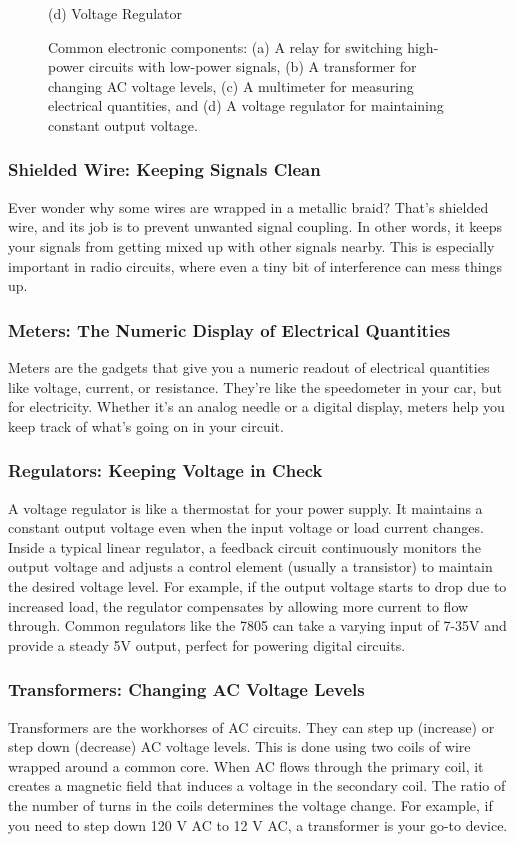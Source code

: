\begin{figure}[h]
\begin{minipage}{0.24\textwidth}
        \caption*{(d) Voltage Regulator}
    \end{minipage}
    \caption{Common electronic components: (a) A relay for switching high-power circuits with low-power signals, (b) A transformer for changing AC voltage levels, (c) A multimeter for measuring electrical quantities, and (d) A voltage regulator for maintaining constant output voltage.}
    \label{fig:electronic-components}
\end{figure}


\subsubsection*{Shielded Wire: Keeping Signals Clean}
Ever wonder why some wires are wrapped in a metallic braid? That's shielded wire, and its job is to prevent unwanted signal coupling. In other words, it keeps your signals from getting mixed up with other signals nearby. This is especially important in radio circuits, where even a tiny bit of interference can mess things up. 

\subsubsection*{Meters: The Numeric Display of Electrical Quantities}
Meters are the gadgets that give you a numeric readout of electrical quantities like voltage, current, or resistance. They’re like the speedometer in your car, but for electricity. Whether it's an analog needle or a digital display, meters help you keep track of what's going on in your circuit.

\subsubsection*{Regulators: Keeping Voltage in Check}
A voltage regulator is like a thermostat for your power supply. It maintains a constant output voltage even when the input voltage or load current changes. Inside a typical linear regulator, a feedback circuit continuously monitors the output voltage and adjusts a control element (usually a transistor) to maintain the desired voltage level. For example, if the output voltage starts to drop due to increased load, the regulator compensates by allowing more current to flow through. Common regulators like the 7805 can take a varying input of 7-35V and provide a steady 5V output, perfect for powering digital circuits.

\subsubsection*{Transformers: Changing AC Voltage Levels}
Transformers are the workhorses of AC circuits. They can step up (increase) or step down (decrease) AC voltage levels. This is done using two coils of wire wrapped around a common core. When AC flows through the primary coil, it creates a magnetic field that induces a voltage in the secondary coil. The ratio of the number of turns in the coils determines the voltage change. For example, if you need to step down 120 V AC to 12 V AC, a transformer is your go-to device.

